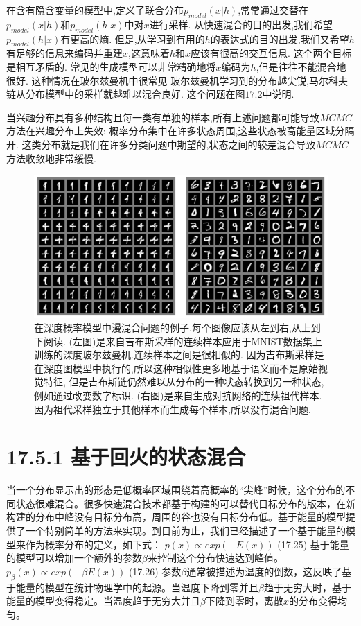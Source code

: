 在含有隐含变量的模型中,定义了联合分布$p_{model}(x|h)$,常常通过交替在$p_{model}(x|h)$和$p_{model}(h|x)$中对$x$进行采样.
从快速混合的目的出发,我们希望$p_{model}(h|x)$有更高的熵.
但是,从学习到有用的$h$的表达式的目的出发,我们又希望$h$有足够的信息来编码并重建$x$,这意味着$h$和$x$应该有很高的交互信息.
这个两个目标是相互矛盾的.
常见的生成模型可以非常精确地将$x$编码为$h$,但是往往不能混合地很好.
这种情况在玻尔兹曼机中很常见-玻尔兹曼机学习到的分布越尖锐,马尔科夫链从分布模型中的采样就越难以混合良好.
这个问题在图$17.2$中说明.

当兴趣分布具有多种结构且每一类有单独的样本,所有上述问题都可能导致$MCMC$方法在兴趣分布上失效:
概率分布集中在许多状态周围,这些状态被高能量区域分隔开.
这类分布就是我们在许多分类问题中期望的,状态之间的较差混合导致$MCMC$方法收敛地非常缓慢.

\begin{figure}[htbp]
	\centering
	\includegraphics[width=5in]{fig/chap17/chap17.2.png}
	\caption{在深度概率模型中漫混合问题的例子.每个图像应该从左到右,从上到下阅读.
	$($左图$)$是来自吉布斯采样的连续样本应用于MNIST数据集上训练的深度玻尔兹曼机.连续样本之间是很相似的.
	因为吉布斯采样是在深度图模型中执行的,所以这种相似性更多地基于语义而不是原始视觉特征,
	但是吉布斯链仍然难以从分布的一种状态转换到另一种状态,例如通过改变数字标识.
	$($右图$)$是来自生成对抗网络的连续祖代样本.因为祖代采样独立于其他样本而生成每个样本,所以没有混合问题.}
	\label{fig:chap17.2.png}
\end{figure}

\section{17.5.1 基于回火的状态混合}
\label{sec:17.5.1}

当一个分布显示出的形态是低概率区域围绕着高概率的“尖峰”时候，这个分布的不同状态很难混合。很多快速混合技术都基于构建的可以替代目标分布的版本，在新构建的分布中峰没有目标分布高，周围的谷也没有目标分布低。基于能量的模型提供了一个特别简单的方法来实现。到目前为止，我们已经描述了一个基于能量的模型来作为概率分布的定义，如下式：
$p(x)\propto exp(-E(x))$                   (17.25)
基于能量的模型可以增加一个额外的参数$\beta$来控制这个分布快速达到峰值。
$p_{\beta}(x)\propto exp(-\beta E(x))$              (17.26)
参数$\beta$通常被描述为温度的倒数，这反映了基于能量的模型在统计物理学中的起源。当温度下降到零并且$\beta$趋于无穷大时，基于能量的模型变得稳定。当温度趋于无穷大并且$\beta$下降到零时，离散$x$的分布变得均匀。

